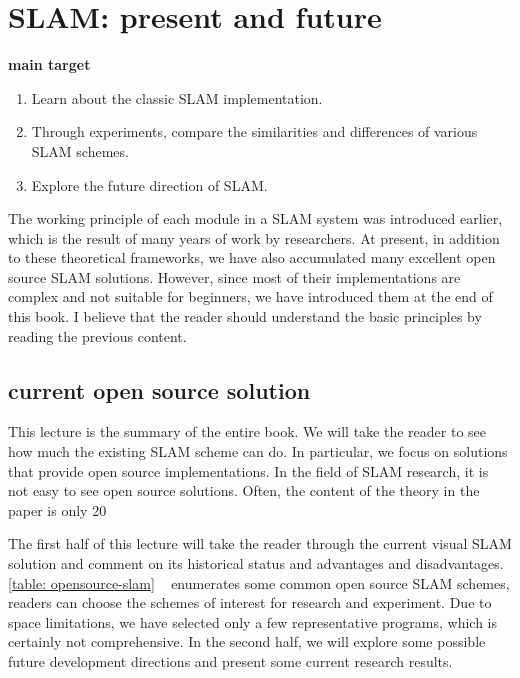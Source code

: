 \chapter{SLAM: present and future}
\begin{mdframed}
\textbf{main target}
\begin{enumerate}[labelindent = 0em, leftmargin = 1.5em]
\item Learn about the classic SLAM implementation.
\item Through experiments, compare the similarities and differences of various SLAM schemes.
\item Explore the future direction of SLAM.
\end{enumerate}
\end{mdframed}

The working principle of each module in a SLAM system was introduced earlier, which is the result of many years of work by researchers. At present, in addition to these theoretical frameworks, we have also accumulated many excellent open source SLAM solutions. However, since most of their implementations are complex and not suitable for beginners, we have introduced them at the end of this book. I believe that the reader should understand the basic principles by reading the previous content.

\newpage
\section{current open source solution}
This lecture is the summary of the entire book. We will take the reader to see how much the existing SLAM scheme can do. In particular, we focus on solutions that provide open source implementations. In the field of SLAM research, it is not easy to see open source solutions. Often, the content of the theory in the paper is only 20%

The first half of this lecture will take the reader through the current visual SLAM solution and comment on its historical status and advantages and disadvantages. \autoref{table: opensource-slam} ~ enumerates some common open source SLAM schemes, readers can choose the schemes of interest for research and experiment. Due to space limitations, we have selected only a few representative programs, which is certainly not comprehensive. In the second half, we will explore some possible future development directions and present some current research results.

